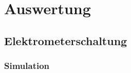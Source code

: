 \documentclass[12pt,english,ngerman]{scrartcl}
\begin{document}
\section{Auswertung}\label{sec:Auswertung}


\subsection{Elektrometerschaltung}

\subsubsection{Simulation}
\end{document}
